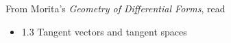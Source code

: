 \documentclass{homework}
\author{Jim Fowler}
\date{Week 2: Tangent vectors}
\begin{document}
\maketitle

From Morita's \textit{Geometry of Differential Forms}, read
\begin{itemize}
\item 1.3 Tangent vectors and tangent spaces
\end{itemize}
\end{document}
